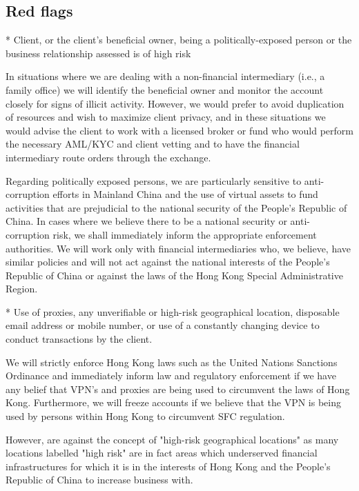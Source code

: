 
\subsection{Red flags}

* Client, or the client’s beneficial owner, being a politically-exposed person or the business relationship assessed is of high risk

In situations where we are dealing with a non-financial intermediary
(i.e., a family office) we will identify the beneficial owner and
monitor the account closely for signs of illicit activity.  However,
we would prefer to avoid duplication of resources and wish to maximize
client privacy, and in these situations we would advise the client to
work with a licensed broker or fund who would perform the necessary
AML/KYC and client vetting and to have the financial intermediary
route orders through the exchange.

Regarding politically exposed persons, we are particularly
sensitive to anti-corruption efforts in Mainland China and the use of
virtual assets to fund activities that are prejudicial to the
national security of the People's Republic of China.  In cases where
we believe there to be a national security or anti-corruption risk, we
shall immediately inform the appropriate enforcement authorities.  We
will work only with financial intermediaries who, we believe, have
similar policies and will not act against the national interests of
the People's Republic of China or against the laws of the Hong Kong
Special Administrative Region.

* Use of proxies, any unverifiable or high-risk geographical location,
disposable email address or mobile number, or use of a constantly
changing device to conduct transactions by the client.

We will strictly enforce Hong Kong laws such as the United Nations
Sanctions Ordinance and immediately inform law and regulatory
enforcement if we have any belief that VPN's and proxies are being
used to circumvent the laws of Hong Kong.  Furthermore, we will freeze
accounts if we believe that the VPN is being used by persons within
Hong Kong to circumvent SFC regulation.

However, are against the concept of "high-risk geographical
locations" as many locations labelled "high risk" are in fact areas
which underserved financial infrastructures for which it is in the
interests of Hong Kong and the People's Republic of China to increase
business with.

